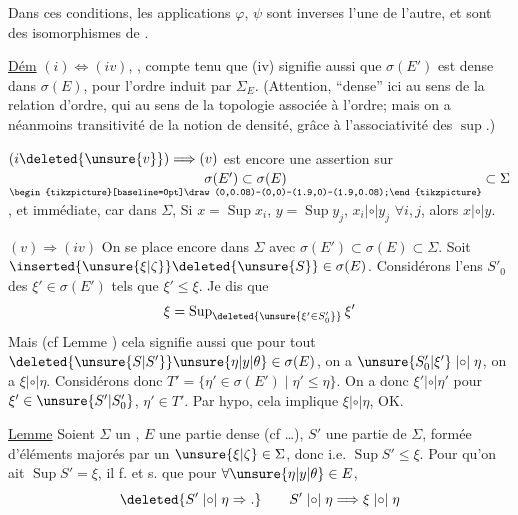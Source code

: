 Dans ces conditions, les applications $\varphi$, $\psi$ sont inverses l'une de l'autre, et sont des isomorphismes de .

\uline{Dém} $(i)\Longleftrightarrow(iv)$, , compte tenu que (iv) signifie aussi que $\sigma(E')$ est dense dans $\sigma(E)$, pour l'ordre induit par $\Sigma_E$. (Attention, ``dense'' ici au sens de la relation d'ordre, qui     au sens de la topologie associée à l'ordre; mais on a néanmoins transitivité de la notion de densité, grâce à l'associativité des $\sup$.)

$(i\deleted{\unsure{v}})\Longrightarrow(v)$ est encore une assertion sur $\underset{\begin{tikzpicture}[baseline=0pt]\draw (0,0.08)--(0,0)--(1.9,0)--(1.9,0.08);\end{tikzpicture}}{\sigma(E')\subset\sigma(E)}\subset\Sigma$, et immédiate, car dans $\Sigma$,  Si $x=\operatorname{Sup}x_i$, $y=\operatorname{Sup}y_j$, $x_i\mathrel{|{\circ}|}y_j$ $\forall i,j$, alors $x\mathrel{|{\circ}|}y$.

$(v)\Longrightarrow(iv)$  On se place encore dans $\Sigma$ avec $\sigma(E')\subset\sigma(E)\subset\Sigma$. Soit  $\inserted{\unsure{\xi|\zeta}}\deleted{\unsure{S}}\in\sigma(E)$.  Considérons l'ens $S'_0$ des $\xi'\in\sigma(E')$ tels que $\xi'\leq\xi$. Je dis que
\[
\xi=\operatorname{Sup}_{\deleted{\unsure{\xi'\in S'_0}}}\xi'
\]
Mais (cf Lemme ) cela signifie aussi que pour tout $\deleted{\unsure{S|S'}}\unsure{\eta|y|\theta}\in\sigma(E)$, on a $\unsure{S'_0|\xi'}\mathrel{|{\circ}|}\eta$, on a $\xi\mathrel{|{\circ}|}\eta$. Considérons donc $T'=\{\eta'\in\sigma(E')\mid\eta'\leq\eta\}$. On a donc $\xi'\mathrel{|{\circ}|}\eta'$ pour $\xi'\in\unsure{S'|S'_0}$, $\eta'\in T'$. Par hypo, cela implique $\xi\mathrel{|{\circ}|}\eta$, OK.


\uline{Lemme} Soient $\Sigma$ un , $E$ une partie dense (cf \ldots), $S'$ une partie de $\Sigma$, formée d'éléments majorés par un $\unsure{\xi|\zeta}\in\Sigma$, donc i.e. $\operatorname{Sup}S'\leq\xi$. Pour qu'on ait $\operatorname{Sup}S'=\xi$, il f. et s. que pour $\forall\unsure{\eta|y|\theta}\in E$, 
\[
\deleted{S'\mathrel{|{\circ}|}\eta\Rightarrow.}\qquad
S'\mathrel{|{\circ}|}\eta\Longrightarrow\xi\mathrel{|{\circ}|}\eta
\]

